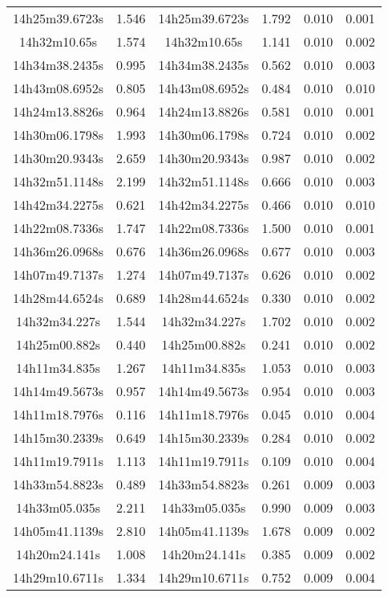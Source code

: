 \begin{table}
\begin{tabular}{cccccc}
14h25m39.6723s & 1.546 & 14h25m39.6723s & 1.792 & 0.010 & 0.001 \\
14h32m10.65s & 1.574 & 14h32m10.65s & 1.141 & 0.010 & 0.002 \\
14h34m38.2435s & 0.995 & 14h34m38.2435s & 0.562 & 0.010 & 0.003 \\
14h43m08.6952s & 0.805 & 14h43m08.6952s & 0.484 & 0.010 & 0.010 \\
14h24m13.8826s & 0.964 & 14h24m13.8826s & 0.581 & 0.010 & 0.001 \\
14h30m06.1798s & 1.993 & 14h30m06.1798s & 0.724 & 0.010 & 0.002 \\
14h30m20.9343s & 2.659 & 14h30m20.9343s & 0.987 & 0.010 & 0.002 \\
14h32m51.1148s & 2.199 & 14h32m51.1148s & 0.666 & 0.010 & 0.003 \\
14h42m34.2275s & 0.621 & 14h42m34.2275s & 0.466 & 0.010 & 0.010 \\
14h22m08.7336s & 1.747 & 14h22m08.7336s & 1.500 & 0.010 & 0.001 \\
14h36m26.0968s & 0.676 & 14h36m26.0968s & 0.677 & 0.010 & 0.003 \\
14h07m49.7137s & 1.274 & 14h07m49.7137s & 0.626 & 0.010 & 0.002 \\
14h28m44.6524s & 0.689 & 14h28m44.6524s & 0.330 & 0.010 & 0.002 \\
14h32m34.227s & 1.544 & 14h32m34.227s & 1.702 & 0.010 & 0.002 \\
14h25m00.882s & 0.440 & 14h25m00.882s & 0.241 & 0.010 & 0.002 \\
14h11m34.835s & 1.267 & 14h11m34.835s & 1.053 & 0.010 & 0.003 \\
14h14m49.5673s & 0.957 & 14h14m49.5673s & 0.954 & 0.010 & 0.003 \\
14h11m18.7976s & 0.116 & 14h11m18.7976s & 0.045 & 0.010 & 0.004 \\
14h15m30.2339s & 0.649 & 14h15m30.2339s & 0.284 & 0.010 & 0.002 \\
14h11m19.7911s & 1.113 & 14h11m19.7911s & 0.109 & 0.010 & 0.004 \\
14h33m54.8823s & 0.489 & 14h33m54.8823s & 0.261 & 0.009 & 0.003 \\
14h33m05.035s & 2.211 & 14h33m05.035s & 0.990 & 0.009 & 0.003 \\
14h05m41.1139s & 2.810 & 14h05m41.1139s & 1.678 & 0.009 & 0.002 \\
14h20m24.141s & 1.008 & 14h20m24.141s & 0.385 & 0.009 & 0.002 \\
14h29m10.6711s & 1.334 & 14h29m10.6711s & 0.752 & 0.009 & 0.004 \\

\end{tabular}
\end{table}
